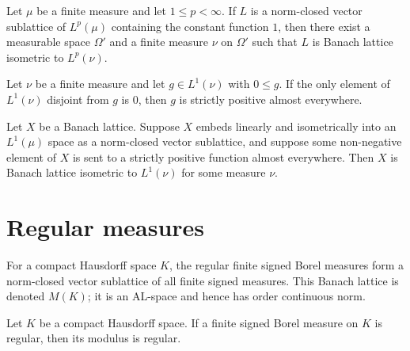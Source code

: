\begin{theorem}
\label{thm:lp-closed-sublattice-containing-one}
\leanok
{}
Let $\mu$ be a finite measure and let $1 \le p < \infty$. If
$L$ is a norm-closed vector sublattice of $L^p(\mu)$ containing
the constant function $1$, then there exist a measurable space
$\Omega'$ and a finite measure $\nu$ on $\Omega'$ such that $L$ is
Banach lattice isometric to $L^p(\nu)$.
\end{theorem}

\begin{lemma}
\label{lem:lp-aePos-of-forall-disjoint-eq-zero}
\leanok
{}
Let $\nu$ be a finite measure and let $g \in L^1(\nu)$ with
$0 \le g$. If the only element of $L^1(\nu)$ disjoint from $g$ is
$0$, then $g$ is strictly positive almost everywhere.
\end{lemma}

\begin{theorem}
\label{thm:exists-L1-banachLatEquiv-of-embeds-in-L1-with-aePositive}
\leanok
{}
Let $X$ be a Banach lattice. Suppose $X$ embeds linearly and
isometrically into an $L^1(\mu)$ space as a norm-closed vector
sublattice, and suppose some non-negative element of $X$ is sent to
a strictly positive function almost everywhere. Then $X$ is Banach
lattice isometric to $L^1(\nu)$ for some measure $\nu$.
\end{theorem}

\section{Regular measures}

For a compact Hausdorff space $K$, the regular finite signed Borel
measures form a norm-closed vector sublattice of all finite signed
measures. This Banach lattice is denoted $M(K)$; it is an AL-space
and hence has order continuous norm.

\begin{lemma}
\label{lem:signedMeasure-regular-abs}
\leanok
{}
Let $K$ be a compact Hausdorff space. If a finite signed Borel
measure on $K$ is regular, then its modulus is regular.
\end{lemma}


